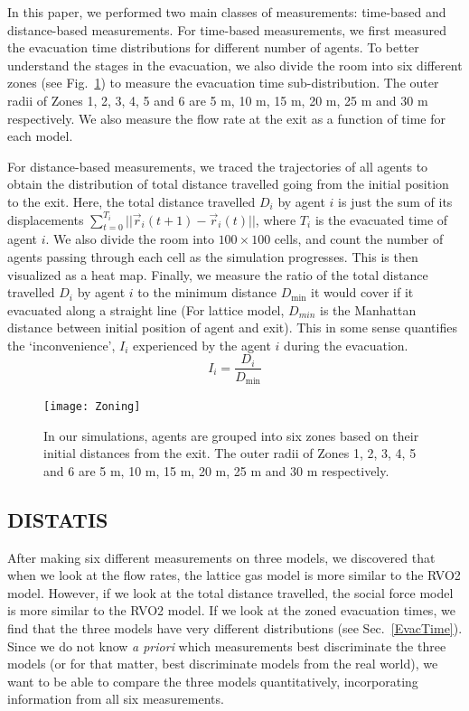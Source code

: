 In this paper, we performed two main classes of measurements: time-based and distance-based measurements. For time-based measurements, we first measured the evacuation time distributions for different number of agents. To better understand the stages in the evacuation, we also divide the room into six different zones (see Fig.~\ref{fig:Zoning}) to measure the evacuation time sub-distribution. The outer radii of Zones 1, 2, 3, 4, 5 and 6 are 5 m, 10 m, 15 m, 20 m, 25 m and 30 m respectively. We also measure the flow rate at the exit as a function of time for each model.

For distance-based measurements, we traced the trajectories of all agents to obtain the distribution of total distance travelled going from the initial position to the exit. Here, the total distance travelled $D_i$ by agent $i$ is just the sum of its displacements $\sum^{T_i}_{t=0}||\vec{r}_i(t+1)-\vec{r}_i(t)||$, where $T_i$ is the evacuated time of agent $i$. We also divide the room into $100 \times 100$ cells, and count the number of agents passing through each cell as the simulation progresses. This is then visualized as a heat map. Finally, we measure the ratio of the total distance travelled $D_i$ by agent $i$ to the minimum distance $D_{\min}$ it would cover if it evacuated along a straight line (For lattice model, $D_{min}$ is the Manhattan distance between initial position of agent and exit). This in some sense quantifies the `inconvenience', $I_i$ experienced by the agent $i$ during the evacuation.
\begin{equation}\label{eqn:Incon}
I_i=\frac{D_i}{D_{\min}}
\end{equation}

\begin{figure}[h]
\begin{center}
\texttt{[image: Zoning]}
\caption{In our simulations, agents are grouped into six zones based on their initial distances from the exit. The outer radii of Zones 1, 2, 3, 4, 5 and 6 are 5 m, 10 m, 15 m, 20 m, 25 m and 30 m respectively.}
\label{fig:Zoning}
\end{center}
\end{figure}


\subsection{DISTATIS}\label{sec:distatis}

After making six different measurements on three models, we discovered that when we look at the flow rates, the lattice gas model is more similar to the RVO2 model. However, if we look at the total distance travelled, the social force model is more similar to the RVO2 model. If we look at the zoned evacuation times, we find that the three models have very different distributions (see Sec.~\ref{EvacTime}). Since we do not know \emph{a priori} which measurements best discriminate the three models (or for that matter, best discriminate models from the real world), we want to be able to compare the three models quantitatively, incorporating information from all six measurements.

